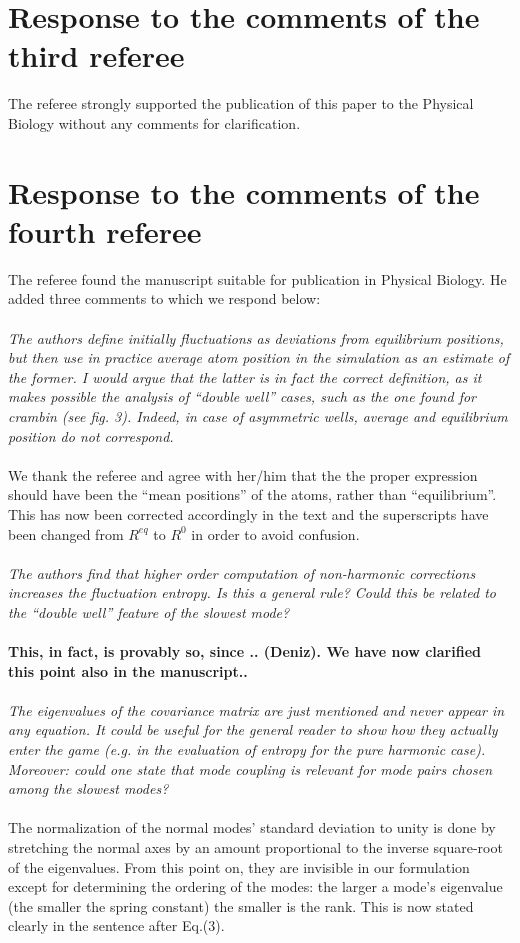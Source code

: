 \documentclass[12pt,article]{iopart}
\begin{document}
\section{Response to the comments of the third referee}

The referee strongly supported the publication of this paper to the Physical
Biology without any comments for clarification.


\section{Response to the comments of the fourth referee}

The referee found the manuscript suitable for publication in Physical
Biology. He added three comments to which we respond below: \\ \\ 
%
{\it The authors define initially fluctuations as deviations from
  equilibrium positions, but then use in practice average atom
  position in the simulation as an estimate of the former. I would
  argue that the latter is in fact the correct definition, as it makes
  possible the analysis of ``double well'' cases, such as the one
  found for crambin (see fig. 3). Indeed, in case of asymmetric wells,
  average and equilibrium position do not correspond.}\\ \\
%
We thank the referee and agree with her/him that the the proper
expression should have been the ``mean positions'' of the atoms,
rather than ``equilibrium''. This has now been corrected accordingly
in the text and the superscripts have been changed from $R^{eq}$ to
$R^{0}$ in order to avoid confusion. \\ \\
%
{\it The authors find that higher order computation of non-harmonic
  corrections increases the fluctuation entropy. Is this a general
  rule?  Could this be related to the ``double well'' feature of the
  slowest mode?} \\ \\ 
%
{\bf This, in fact, is provably so, since .. (Deniz). We have now
  clarified this point also in the manuscript..}\\ \\ 
%
{\it The eigenvalues of the covariance matrix are just mentioned and
  never appear in any equation. It could be useful for the general
  reader to show how they actually enter the game (e.g. in the
  evaluation of entropy for the pure harmonic case). Moreover: could
  one state that mode coupling is relevant for mode pairs chosen among
  the slowest modes?}\\ \\
%
The normalization of the normal modes' standard deviation to unity is
done by stretching the normal axes by an amount proportional to the
inverse square-root of the eigenvalues. From this point on, they are
invisible in our formulation except for determining the ordering of
the modes: the larger a mode's eigenvalue (the smaller the spring
constant) the smaller is the rank. This is now stated clearly in the
sentence after Eq.(3).
\end{document}
